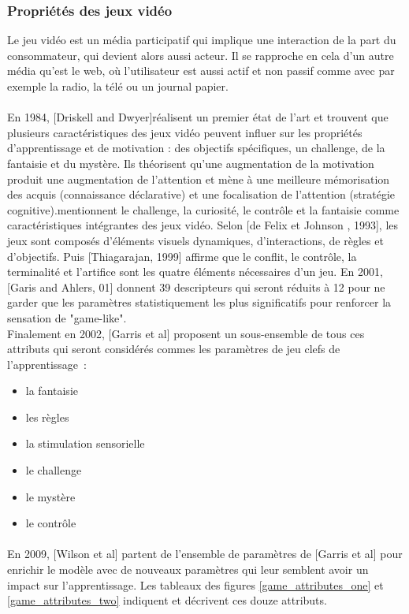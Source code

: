 		\subsubsection*{Propriétés des jeux vidéo}
Le jeu vidéo est un média participatif qui implique une interaction de la part du consommateur, qui devient alors aussi acteur. Il se rapproche en cela d'un autre média qu'est le web, où l'utilisateur est aussi actif et non passif comme avec par exemple la radio, la télé ou un journal papier. \paragraph{}
 En 1984, [Driskell and Dwyer]\cite{Dris84}réalisent un premier état de l'art et trouvent que plusieurs caractéristiques des jeux vidéo peuvent influer sur les propriétés d'apprentissage et de motivation : des objectifs spécifiques, un challenge, de la fantaisie et du mystère. Ils théorisent qu'une augmentation de la motivation produit une augmentation de l'attention et mène à une meilleure mémorisation des acquis (connaissance déclarative) et une focalisation de l'attention (stratégie cognitive). mentionnent le challenge, la curiosité, le contrôle et la fantaisie comme caractéristiques intégrantes des jeux vidéo. Selon [de Felix et Johnson , 1993], les jeux sont composés d'éléments visuels dynamiques, d'interactions, de règles et d'objectifs. Puis [Thiagarajan, 1999] affirme que le conflit, le contrôle, la terminalité et l'artifice sont les quatre éléments nécessaires d'un jeu. En 2001, [Garis and Ahlers, 01] donnent 39 descripteurs qui seront réduits à 12 pour ne garder que les paramètres statistiquement les plus significatifs pour renforcer la sensation de "game-like". \\ Finalement en 2002, [Garris et al] proposent un sous-ensemble de tous ces attributs qui seront considérés commes les paramètres de jeu clefs de l'apprentissage~:
\begin{itemize}
	\item la fantaisie
	\item les règles
	\item la stimulation sensorielle
	\item le challenge
	\item le mystère
	\item le contrôle
\end{itemize}

\paragraph{}En 2009, [Wilson et al]\cite{Wils09} partent de l'ensemble de paramètres de [Garris et al] pour enrichir le modèle avec de nouveaux paramètres qui leur semblent avoir un impact sur l'apprentissage.
Les tableaux des figures \ref{game_attributes_one} et \ref{game_attributes_two} indiquent et décrivent ces douze attributs.

